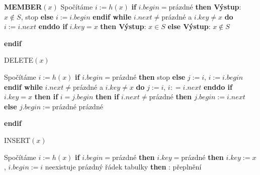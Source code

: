 \documentclass[a4paper,12pt]{article}
\begin{document}
{\bf MEMBER$(x)$}\newline 
Spočítáme $i:=h(x)$\newline 
{\bf if} $i.begin=$prázdné {\bf then Výstup}: $x\notin S$, stop {\bf else} $i:=i.begin$ {\bf endif\newline 
while} $i.next\ne$prázdné a $i.key\ne x$ {\bf do} $i:=i.next$ {\bf enddo \newline 
if} $i.key=x$ {\bf then Výstup}: $x\in S$ {\bf else Výstup}: $
x\notin S$ {\bf endif
\bigskip

DELETE$(x)$}\newline 
Spočítáme $i:=h(x)$\newline 
{\bf if} $i.begin=$prázdné {\bf then} stop {\bf else} $j:=i$, $
i:=i.begin$ {\bf endif\newline 
while} $i.next\ne$prázdné a $i.key\ne x$ {\bf do} $j:=i$, $i:
=i.next$ {\bf enddo \newline 
if} $i.key=x$ {\bf then\newline 
\phantom{{\rm ---}}if} $i=j.begin$ {\bf then\newline 
\phantom{{\rm ------}}if} $i.next\ne$prázdné {\bf then\newline 
\phantom{{\rm ---------}}$j.begin:=i.next$\newline 
\phantom{{\rm ------}}else\newline 
\phantom{{\rm ---------}}$j.begin:=$}prázdné\newline 
{}prázdné\newline 
{\bf endif
\bigskip

INSERT$(x)$}\newline 
Spočítáme $i:=h(x)$\newline 
{\bf if} $i.begin=$prázdné {\bf then}\newline 
\phantom{---}{\bf if} $i.key=$prázdné {\bf then}\newline 
\phantom{------}$i.key:=x$, $i.begin:=i$\newline 
\phantom{---}{\bf else}\newline 
\phantom{------}{\bf if} neexistuje prázdný řádek tabulky {\bf then}\newline 
\phantom{---------}{\bf Výstup}: přeplnění\newline 
\end{document}
